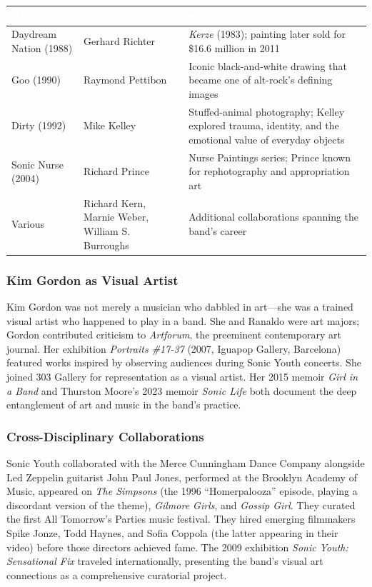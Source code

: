 \documentclass[11pt,letterpaper]{article}
\newcommand{\tableheader}[1]{\textbf{\sffamily\textcolor{white}{#1}}}
\begin{document}
\begin{center}
\begin{tabularx}{\textwidth}{L{3.5cm}L{3cm}X}
\toprule
{}
\tableheader{Album} & \tableheader{Artist} & \tableheader{Significance} \\
\midrule
Daydream Nation (1988) & Gerhard Richter & \textit{Kerze} (1983); painting later sold for \$16.6 million in 2011 \\
Goo (1990) & Raymond Pettibon & Iconic black-and-white drawing that became one of alt-rock's defining images \\
Dirty (1992) & Mike Kelley & Stuffed-animal photography; Kelley explored trauma, identity, and the emotional value of everyday objects \\
Sonic Nurse (2004) & Richard Prince & Nurse Paintings series; Prince known for rephotography and appropriation art \\
Various & Richard Kern, Marnie Weber, William S. Burroughs & Additional collaborations spanning the band's career \\
\bottomrule
\end{tabularx}
\end{center}

\subsubsection{Kim Gordon as Visual Artist}

Kim Gordon was not merely a musician who dabbled in art---she was a trained visual artist who happened to play in a band. She and Ranaldo were art majors; Gordon contributed criticism to \textit{Artforum}, the preeminent contemporary art journal. Her exhibition \textit{Portraits \#17-37} (2007, Iguapop Gallery, Barcelona) featured works inspired by observing audiences during Sonic Youth concerts. She joined 303 Gallery for representation as a visual artist. Her 2015 memoir \textit{Girl in a Band} and Thurston Moore's 2023 memoir \textit{Sonic Life} both document the deep entanglement of art and music in the band's practice.

\subsubsection{Cross-Disciplinary Collaborations}

Sonic Youth collaborated with the Merce Cunningham Dance Company alongside Led Zeppelin guitarist John Paul Jones, performed at the Brooklyn Academy of Music, appeared on \textit{The Simpsons} (the 1996 ``Homerpalooza'' episode, playing a discordant version of the theme), \textit{Gilmore Girls}, and \textit{Gossip Girl}. They curated the first All Tomorrow's Parties music festival. They hired emerging filmmakers Spike Jonze, Todd Haynes, and Sofia Coppola (the latter appearing in their video) before those directors achieved fame. The 2009 exhibition \textit{Sonic Youth: Sensational Fix} traveled internationally, presenting the band's visual art connections as a comprehensive curatorial project.
\end{document}
